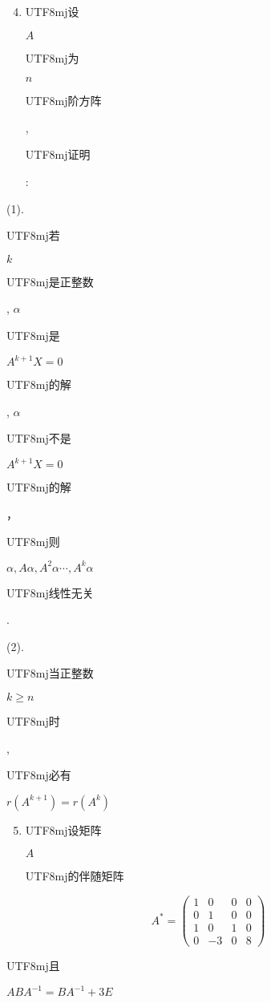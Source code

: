 \documentclass[10pt]{article}
\begin{document}
\begin{enumerate}
  \setcounter{enumi}{3}
  \item \begin{CJK}{UTF8}{mj}设\end{CJK} $A$ \begin{CJK}{UTF8}{mj}为\end{CJK} $n$ \begin{CJK}{UTF8}{mj}阶方阵\end{CJK}, \begin{CJK}{UTF8}{mj}证明\end{CJK}:
\end{enumerate}
(1). \begin{CJK}{UTF8}{mj}若\end{CJK} $k$ \begin{CJK}{UTF8}{mj}是正整数\end{CJK}, $\alpha$ \begin{CJK}{UTF8}{mj}是\end{CJK} $A^{k+1} X=0$ \begin{CJK}{UTF8}{mj}的解\end{CJK}, $\alpha$ \begin{CJK}{UTF8}{mj}不是\end{CJK} $A^{k+1} X=0$ \begin{CJK}{UTF8}{mj}的解\end{CJK}，\begin{CJK}{UTF8}{mj}则\end{CJK} $\alpha, A \alpha, A^{2} \alpha \cdots, A^{k} \alpha$ \begin{CJK}{UTF8}{mj}线性无关\end{CJK}.

(2). \begin{CJK}{UTF8}{mj}当正整数\end{CJK} $k \geq n$ \begin{CJK}{UTF8}{mj}时\end{CJK}, \begin{CJK}{UTF8}{mj}必有\end{CJK} $r\left(A^{k+1}\right)=r\left(A^{k}\right)$

\begin{enumerate}
  \setcounter{enumi}{4}
  \item \begin{CJK}{UTF8}{mj}设矩阵\end{CJK} $A$ \begin{CJK}{UTF8}{mj}的伴随矩阵\end{CJK}
\end{enumerate}
$$
A^{*}=\left(\begin{array}{cccc}
1 & 0 & 0 & 0 \\
0 & 1 & 0 & 0 \\
1 & 0 & 1 & 0 \\
0 & -3 & 0 & 8
\end{array}\right)
$$
\begin{CJK}{UTF8}{mj}且\end{CJK} $A B A^{-1}=B A^{-1}+3 E$
\end{document}
